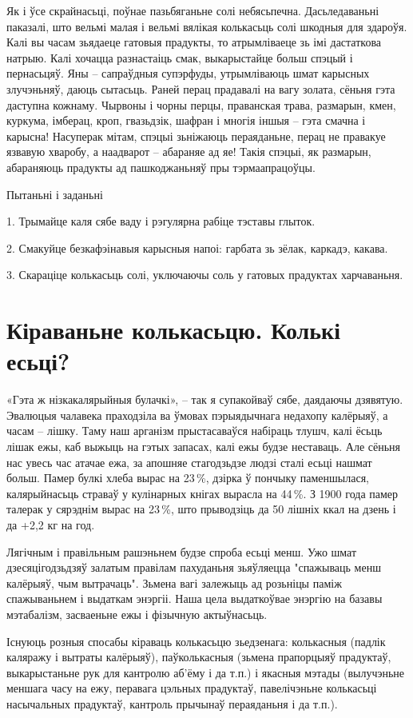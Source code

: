 Як і ўсе скрайнасьці, поўнае пазьбяганьне солі небясьпечна. Дасьледаваньні паказалі, што вельмі малая і вельмі вялікая колькасьць солі шкодныя для здароўя. Калі вы часам зьядаеце гатовыя прадукты, то атрымліваеце зь імі дастаткова натрыю. Калі хочацца разнастаіць смак, выкарыстайце больш спэцый і пернасьцяў. Яны – сапраўдныя супэрфуды, утрымліваюць шмат карысных злучэньняў, даюць сытасьць. Раней перац прадавалі на вагу золата, сёньня гэта даступна кожнаму. Чырвоны і чорны перцы, праванская трава, размарын, кмен, куркума, імберац, кроп, гвазьдзік, шафран і многія іншыя – гэта смачна і карысна! Насуперак мітам, спэцыі зьніжаюць пераяданьне, перац не правакуе язвавую хваробу, а наадварот – абараняе ад яе! Такія спэцыі, як размарын, абараняюць прадукты ад пашкоджаньняў пры тэрмаапрацоўцы.

Пытаньні і заданьні

1. Трымайце каля сябе ваду і рэгулярна рабіце тэставы глыток.

2. Смакуйце безкафэінавыя карысныя напоі: гарбата зь зёлак, каркадэ, какава.

3. Скараціце колькасьць солі, уключаючы соль у гатовых прадуктах харчаваньня.


\section{Кіраваньне колькасьцю. Колькі есьці?}

«Гэта ж нізкакалярыйныя булачкі», – так я супакойваў сябе, даядаючы дзявятую. Эвалюцыя чалавека праходзіла ва ўмовах пэрыядычнага недахопу калёрыяў, а часам – лішку. Таму наш арганізм прыстасаваўся набіраць тлушч, калі ёсьць лішак ежы, каб выжыць на гэтых запасах, калі ежы будзе неставаць. Але сёньня нас увесь час атачае ежа, за апошняе стагодзьдзе людзі сталі есьці нашмат больш. Памер булкі хлеба вырас на 23\,\%, дзірка ў пончыку паменшылася, калярыйнасьць страваў у кулінарных кнігах вырасла на 44\,\%. З 1900 года памер талерак у сярэднім вырас на 23\,\%, што прыводзіць да 50 лішніх ккал на дзень і да +2,2 кг на год.

Лягічным і правільным рашэньнем будзе спроба есьці менш. Ужо шмат дзесяцігодзьдзяў залатым правілам пахуданьня зьяўляецца "спажываць менш калёрыяў, чым вытрачаць". Зьмена вагі залежыць ад розьніцы паміж спажываньнем і выдаткам энэргіі. Наша цела выдаткоўвае энэргію на базавы мэтабалізм, засваеньне ежы і фізычную актыўнасьць.

Існуюць розныя спосабы кіраваць колькасьцю зьедзенага: колькасныя (падлік каляражу і вытраты калёрыяў), паўколькасныя (зьмена прапорцыяў прадуктаў, выкарыстаньне рук для кантролю аб'ёму і да т.п.) і якасныя мэтады (вылучэньне меншага часу на ежу, перавага цэльных прадуктаў, павелічэньне колькасьці насычальных прадуктаў, кантроль прычынаў пераяданьня і да т.п.).

